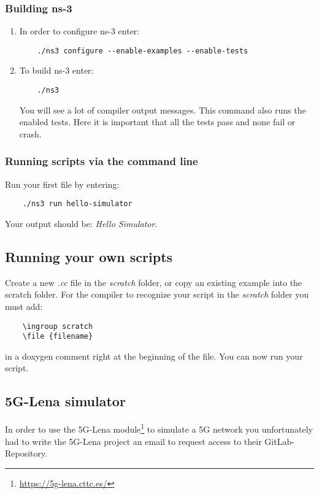 \subsubsection{Building ns-3}

\begin{enumerate}
    \item In order to configure ns-3 enter: \begin{verbatim}
    ./ns3 configure --enable-examples --enable-tests
\end{verbatim}
\item To build ns-3 enter: \begin{verbatim}
    ./ns3
\end{verbatim}
    You will see a lot of compiler output messages. This command also runs the enabled tests. Here it is important that all the tests pass and none fail or crash.
\end{enumerate}

\subsubsection{Running scripts via the command line}

Run your first file by entering: 
\begin{verbatim}
    ./ns3 run hello-simulator
\end{verbatim}
Your output should be: \textit{Hello Simulator}.

\subsection{Running your own scripts}

Create a new \textit{.cc} file in the \textit{scratch} folder, or copy an existing example into the scratch folder. For the compiler to recognize your script in the \textit{scratch} folder you must add: \begin{verbatim}
    \ingroup scratch
    \file {filename}
\end{verbatim} in a doxygen comment right at the beginning of the file. You can now run your script.

\subsection{5G-Lena simulator}
In order to use the 5G-Lena module\footnote[5]{\url{https://5g-lena.cttc.es/}} to simulate a 5G network you unfortunately had to write the 5G-Lena project an email to request access to their GitLab-Repository.

